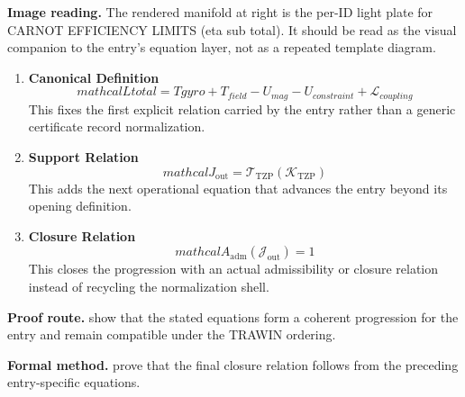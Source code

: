 \begin{samepage}
\noindent\begin{minipage}[t]{0.45\linewidth}
\vspace{0pt}
\raggedright
\scriptsize\textbf{Image reading.} The rendered manifold at right is the per-ID light plate for CARNOT EFFICIENCY LIMITS (eta sub total). It should be read as the visual companion to the entry's equation layer, not as a repeated template diagram.\par
\end{minipage}\hfill
\begin{minipage}[t]{0.53\linewidth}
\vspace*{-0.10in}
\raggedright
{}
\end{minipage}
\end{samepage}

\clearpage


\begin{enumerate}[leftmargin=1.6em,itemsep=9pt,topsep=6pt]
\item \textbf{Canonical Definition}
\[
mathcal{L} {total} = T {gyro} + T_{field} - U_{mag} - U_{constraint} + \mathcal{L}_{coupling}
\]
This fixes the first explicit relation carried by the entry rather than a generic certificate record normalization.

\item \textbf{Support Relation}
\[
mathcal{J}_{\mathrm{out}} = \mathcal{T}_{\mathrm{TZP}}\!\left(\mathcal{K}_{\mathrm{TZP}}\right)
\]
This adds the next operational equation that advances the entry beyond its opening definition.

\item \textbf{Closure Relation}
\[
mathcal{A}_{\mathrm{adm}}\!\left(\mathcal{J}_{\mathrm{out}}\right)=1
\]
This closes the progression with an actual admissibility or closure relation instead of recycling the normalization shell.
\end{enumerate}

\textbf{Proof route.} show that the stated equations form a coherent progression for the entry and remain compatible under the TRAWIN ordering.

\textbf{Formal method.} prove that the final closure relation follows from the preceding entry-specific equations.

\medskip
{}

